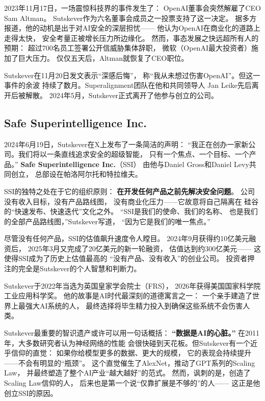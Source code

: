2023年11月17日，一场震惊科技界的事件发生了：
OpenAI董事会突然解雇了CEO Sam Altman。
Sutskever作为六名董事会成员之一投票支持了这一决定。
据多方报道，他的动机是出于对AI安全的深层担忧——
他认为OpenAI在商业化的道路上走得太快，
安全考量正被增长压力所边缘化。
然而，事态发展之快远超所有人的预期：
超过700名员工签署公开信威胁集体辞职，
微软（OpenAI最大投资者）施加了巨大压力。
仅仅五天后，Altman就恢复了CEO职位。

Sutskever在11月20日发文表示``深感后悔''，
称``我从未想过伤害OpenAI''。但这一事件的余波
持续了数月。Superalignment团队在他和共同领导人
Jan Leike先后离开后被解散。
2024年5月，Sutskever正式离开了他参与创立的公司。

\subsection{Safe Superintelligence Inc.}

2024年6月19日，Sutskever在X上发布了一条简洁的声明：
``我正在创办一家新公司。我们将以一条直线追求安全的超级智能，
只有一个焦点、一个目标、一个产品。''
\textbf{Safe Superintelligence Inc.}（SSI）
由他与Daniel Gross和Daniel Levy共同创立，
总部设在帕洛阿尔托和特拉维夫。

SSI的独特之处在于它的组织原则：
\textbf{在开发任何产品之前先解决安全问题}。
公司没有收入目标，没有产品路线图，
没有商业化压力——它故意将自己隔离在
硅谷的``快速发布、快速迭代''文化之外。
``SSI是我们的使命、我们的名称、
也是我们的全部产品路线图，''Sutskever写道，
``因为它是我们的唯一焦点。''

尽管没有任何产品，SSI的估值飙升速度令人瞠目。
2024年9月获得约10亿美元融资后，
2025年3月又完成了20亿美元的新一轮融资，
估值达到约300亿美元——
这使得SSI成为了历史上估值最高的
``没有产品、没有收入''的创业公司。
投资者押注的完全是Sutskever的个人智慧和判断力。

Sutskever于2022年当选为英国皇家学会院士（FRS），
2026年获得美国国家科学院工业应用科学奖。
他的故事是AI时代最深刻的道德寓言之一：
一个亲手建造了世界上最强大AI系统的人，
最终选择将毕生精力投入到确保这些系统不会伤害人类。

\begin{whybox}
Sutskever最重要的智识遗产或许可以用一句话概括：
\textbf{``数据是AI的心脏。''}
在2011年，大多数研究者认为神经网络的性能
会很快碰到天花板。但Sutskever有一个近乎信仰的直觉：
如果你给模型更多的数据、更大的规模，
它的表现会持续提升——不会有明显的``瓶颈''。
这个直觉催生了AlexNet，推动了GPT系列的Scaling Law，
并最终塑造了整个AI产业``越大越好''的范式。
然而，讽刺的是，创造了Scaling Law信仰的人，
后来也是第一个说``仅靠扩展是不够的''的人——
这正是他创立SSI的原因。
\end{whybox}


